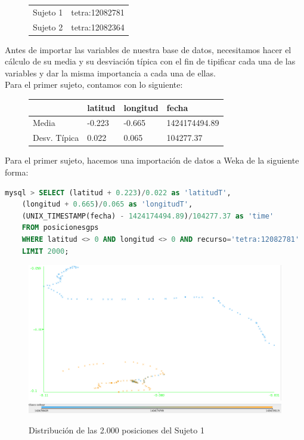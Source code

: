 \documentclass[a4paper, 12pt]{article}
\begin{document}
\begin{figure}[H]
	\begin{tabular}{| l | l |}
	\hline
		Sujeto 1 & tetra:12082781 \\
		Sujeto 2 & tetra:12082364 \\	
	\hline
	\end{tabular}
\end{figure}

Antes de importar las variables de nuestra base de datos, necesitamos hacer el c\'alculo de su media y su desviaci\'on t\'ipica con el fin de tipificar cada una de las variables y dar la misma importancia a cada una de ellas. \\

Para el primer sujeto, contamos con lo siguiente:\\

\begin{figure}[H]
	\begin{tabular}{| l | l | l | l |}
	\hline
	\rowcolor{LightCyan}
	\hline
  		& latitud & longitud & fecha \\
	\hline
		Media & -0.223 & -0.665 & 1424174494.89 \\
		Desv. T\'ipica & 0.022 & 0.065	& 104277.37 \\
	\hline
	\end{tabular}
\end{figure}

Para el primer sujeto, hacemos una importaci\'on de datos a Weka de la siguiente forma:\\

\begin{lstlisting}[language=sql, columns=fullflexible, basicstyle=\small, frame=tblr]
mysql > SELECT (latitud + 0.223)/0.022 as 'latitudT', 
	(longitud + 0.665)/0.065 as 'longitudT',
	(UNIX_TIMESTAMP(fecha) - 1424174494.89)/104277.37 as 'time'
	FROM posicionesgps
	WHERE latitud <> 0 AND longitud <> 0 AND recurso='tetra:12082781'
	LIMIT 2000;
\end{lstlisting}

\begin{figure}[H]
	\includegraphics[scale=.5]{../comparativa/sujeto1.png}
	\includegraphics[scale=.4]{../comparativa/leyenda.png}
	\caption{Distribuci\'on de las 2.000 posiciones del Sujeto 1}
\end{figure}
\end{document}
